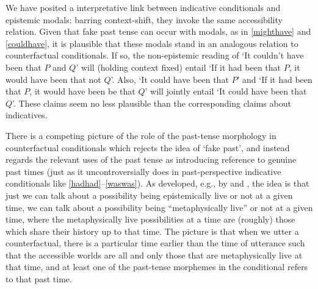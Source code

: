 \documentclass[If.tex]{subfiles}
\begin{document}
We have posited a interpretative link between indicative conditionals and epistemic modals: barring context-shift, they invoke the same accessibility relation. Given that fake past tense can occur with modals, as in \ref{mighthave} and \ref{couldhave}, it is plausible that these modals stand in an analogous relation to counterfactual conditionals. If so, the non-epistemic reading of ‘It couldn't have been that $P$ and $Q$’ will (holding context fixed) entail ‘If it had been that $P$, it would have been that not $Q$’. Also, ‘It could have been that $P$’ and ‘If it had been that $P$, it would have been be that $Q$’ will jointly entail ‘It could have been that $Q$’.%
These claims seem no less plausible than the corresponding claims about indicatives.

There is a competing picture of the role of the past-tense morphology in counterfactual conditionals which rejects the idea of ‘fake past’, and instead regards the relevant uses of the past tense as introducing reference to genuine past times (just as it uncontroversially does in past-perspective indicative conditionals like \ref{hadhad}--\ref{waswas}). As developed, e.g., by \citet{CondoravdiTIM} and \citet{KhooISC}, the idea is that just we can talk about a possibility being epistemically live or not at a given time, we can talk about a possibility being “metaphysically live” or not at a given time, where the metaphysically live possibilities at a time are (roughly) those which share their history up to that time. The picture is that when we utter a counterfactual, there is a particular time earlier than the time of utterance such that the accessible worlds are all and only those that are metaphysically live at that time, and at least one of the past-tense morphemes in the conditional refers to that past time.
\end{document}
